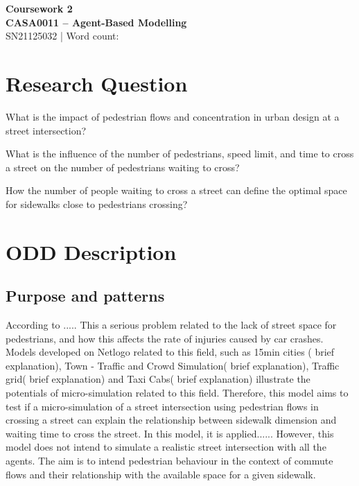 \documentclass[10pt]{report}
\author{Felipe Santos Almeida}
\numberwithin{figure}{section}
\numberwithin{table}{section}
\begin{document}

\begin{center}
    \vspace*{-3cm}
\end{center}   
    {\LARGE\textbf{Coursework 2\\
    CASA0011 – Agent-Based Modelling\\}}
SN21125032 | Word count:

\vspace{5mm} %
  
\section{Research Question}


What is the impact of pedestrian flows and concentration in urban design at a street intersection?

What is the influence of the number of pedestrians, speed limit, and time to cross a street on the number of pedestrians waiting to cross?


How the number of people waiting to cross a street can define the optimal space for sidewalks close to pedestrians crossing?


\section{ODD Description}
\subsection{Purpose and patterns}

According to ..... This a serious problem related to the lack of street space for pedestrians, and how this affects the rate of injuries caused by car crashes. Models developed on Netlogo related to this field, such as 15min cities ( brief explanation), Town - Traffic and Crowd Simulation( brief explanation), Traffic grid( brief explanation) and Taxi Cabs( brief explanation) illustrate the potentials of micro-simulation related to this field.
Therefore, this model aims to test if a micro-simulation of a street intersection using pedestrian flows in crossing a street can explain the relationship between sidewalk dimension and waiting time to cross the street. In this model, it is applied...... However, this model does not intend to simulate a realistic street intersection with all the agents. The aim is to intend pedestrian behaviour in the context of commute flows and their relationship with the available space for a given sidewalk.  
\end{document}
